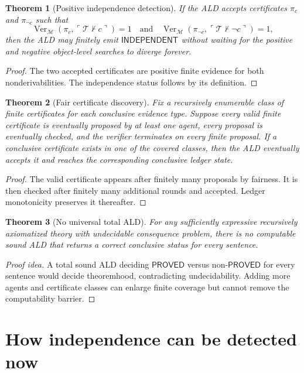 \documentclass[11pt]{article}
\newtheorem{theorem}{Theorem}[section]
\theoremstyle{definition}
\theoremstyle{remark}
\newcommand{\T}{\mathcal T}
\newcommand{\M}{\mathcal M}
\newcommand{\Prov}{\mathsf{PROVED}}
\newcommand{\Ind}{\mathsf{INDEPENDENT}}
\newcommand{\Ver}{\operatorname{Ver}}
\begin{document}
\begin{theorem}[Positive independence detection]
If the ALD accepts certificates $\pi_c$ and $\pi_{\neg c}$ such that
\[
\Ver_{\M}(\pi_c,\ulcorner\T\nvdash c\urcorner)=1
\quad\text{and}\quad
\Ver_{\M}(\pi_{\neg c},\ulcorner\T\nvdash\neg c\urcorner)=1,
\]
then the ALD may finitely emit $\Ind$ without waiting for the positive and negative object-level searches to diverge forever.
\end{theorem}
\begin{proof}
The two accepted certificates are positive finite evidence for both nonderivabilities. The independence status follows by its definition.
\end{proof}

\begin{theorem}[Fair certificate discovery]
Fix a recursively enumerable class of finite certificates for each conclusive evidence type. Suppose every valid finite certificate is eventually proposed by at least one agent, every proposal is eventually checked, and the verifier terminates on every finite proposal. If a conclusive certificate exists in one of the covered classes, then the ALD eventually accepts it and reaches the corresponding conclusive ledger state.
\end{theorem}
\begin{proof}
The valid certificate appears after finitely many proposals by fairness. It is then checked after finitely many additional rounds and accepted. Ledger monotonicity preserves it thereafter.
\end{proof}

\begin{theorem}[No universal total ALD]
For any sufficiently expressive recursively axiomatized theory with undecidable consequence problem, there is no computable sound ALD that returns a correct conclusive status for every sentence.
\end{theorem}
\begin{proof}[Proof idea]
A total sound ALD deciding $\Prov$ versus non-$\Prov$ for every sentence would decide theoremhood, contradicting undecidability. Adding more agents and certificate classes can enlarge finite coverage but cannot remove the computability barrier.
\end{proof}

\section{How independence can be detected now}
\end{document}
